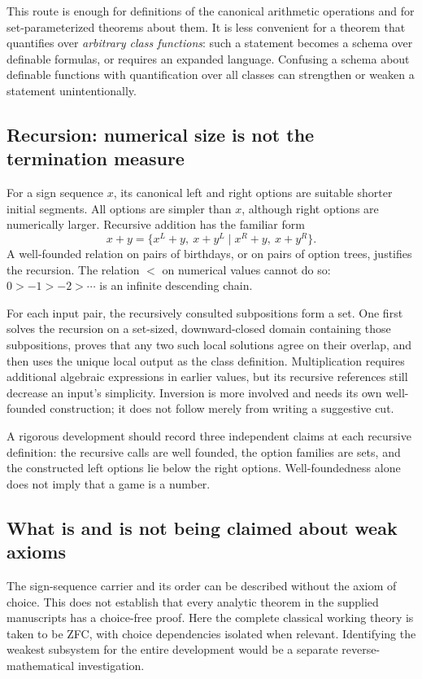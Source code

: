 \documentclass[11pt,letterpaper]{article}
\numberwithin{equation}{section}
\theoremstyle{definition}
\theoremstyle{remark}
\begin{document}
This route is enough for definitions of the canonical arithmetic operations and for set-parameterized theorems about them. It is less convenient for a theorem that quantifies over \emph{arbitrary class functions}: such a statement becomes a schema over definable formulas, or requires an expanded language. Confusing a schema about definable functions with quantification over all classes can strengthen or weaken a statement unintentionally.

\subsection{Recursion: numerical size is not the termination measure}
For a sign sequence $x$, its canonical left and right options are suitable shorter initial segments. All options are simpler than $x$, although right options are numerically larger. Recursive addition has the familiar form
\begin{equation}\label{eq:conwayadd}
 x+y=\{x^L+y,\ x+y^L\mid x^R+y,\ x+y^R\}.
\end{equation}
A well-founded relation on pairs of birthdays, or on pairs of option trees, justifies the recursion. The relation $<$ on numerical values cannot do so: $0>-1>-2>\cdots$ is an infinite descending chain.

For each input pair, the recursively consulted subpositions form a set. One first solves the recursion on a set-sized, downward-closed domain containing those subpositions, proves that any two such local solutions agree on their overlap, and then uses the unique local output as the class definition. Multiplication requires additional algebraic expressions in earlier values, but its recursive references still decrease an input's simplicity. Inversion is more involved and needs its own well-founded construction; it does not follow merely from writing a suggestive cut.

A rigorous development should record three independent claims at each recursive definition: the recursive calls are well founded, the option families are sets, and the constructed left options lie below the right options. Well-foundedness alone does not imply that a game is a number.

\subsection{What is and is not being claimed about weak axioms}
The sign-sequence carrier and its order can be described without the axiom of choice. This does not establish that every analytic theorem in the supplied manuscripts has a choice-free proof. Here the complete classical working theory is taken to be ZFC, with choice dependencies isolated when relevant. Identifying the weakest subsystem for the entire development would be a separate reverse-mathematical investigation.
\end{document}

